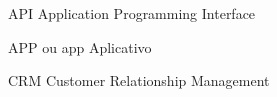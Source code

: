 \begin{siglas}
  \item[API] Application Programming Interface
  \item[APP ou app] Aplicativo
  \item[CRM] Customer Relationship Management
\end{siglas}
